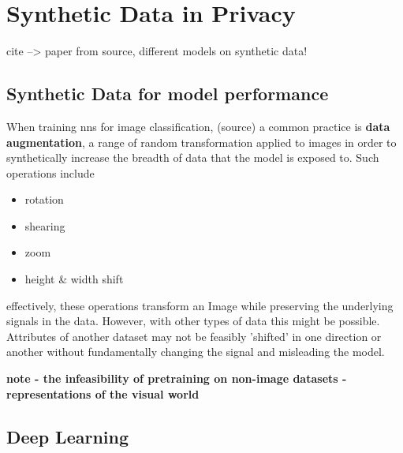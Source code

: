 \chapter{Synthetic Data in Privacy}

cite --> paper from source, different models on synthetic data!

\section{Synthetic Data for model performance}

When training \acp{nn} for image classification, (source) a common practice is \textbf{data augmentation}, a range of random transformation applied to images in order to synthetically increase the breadth of data that the model is exposed to. 
Such operations include 
\begin{itemize}
	\item rotation
	\item shearing
	\item zoom
	\item height \& width shift
\end{itemize}

effectively, these operations transform an Image while preserving the underlying signals in the data. However, with other types of data this might be possible. Attributes of another dataset may not be feasibly 'shifted' in one direction or another without fundamentally changing the signal and misleading the model.

\textbf{note - the infeasibility of pretraining on non-image datasets - representations of the visual world}

\section{Deep Learning}

\Blindtext[4][1]
